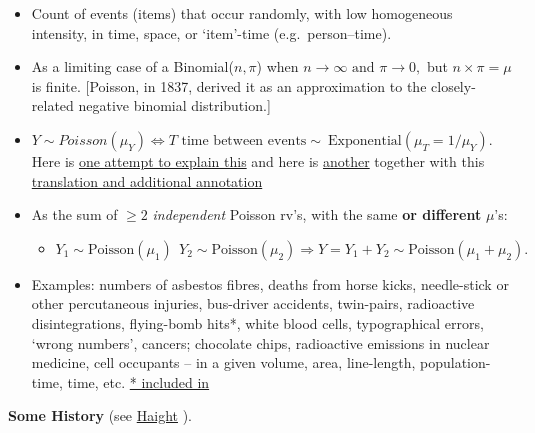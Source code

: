 \documentclass[]{book}
\providecommand{\tightlist}{%
  \setlength{\itemsep}{0pt}\setlength{\parskip}{0pt}}
\begin{document}
\begin{itemize}
\item
  Count of events (items) that occur randomly, with low
  homogeneous intensity, in time, space, or `item'-time (e.g.~person--time).
\item
  As a limiting case of a Binomial(\(n,\pi\)) when \(n \rightarrow \infty\textrm{ and } \pi \rightarrow 0,\) but \(n \times \pi = \mu\) is finite. {[}Poisson, in 1837, derived it as an approximation to the closely-related negative binomial distribution.{]}
\item
  \(Y\sim Poisson(\mu_{Y}) \Leftrightarrow T \textrm{ time between events}\sim \: \textrm{Exponential}(\mu_{T} = 1/\mu_{Y}).\)
  Here is \href{http://www.epi.mcgill.ca/hanley/bios601/Intensity-Rate/Randomness_poisson.pdf}{one attempt to explain this} and here is \href{http://www.medicine.mcgill.ca/epidemiology/hanley/Reprints/Accromath-2015-1-4.pdf}{another} together with this \href{http://www.medicine.mcgill.ca/epidemiology/hanley/bios601/Mean-Quantile/forAccromathBackTranslate.pdf}{translation and additional annotation}
\item
  As the sum of \(\ge 2\) \emph{independent} Poisson rv's, with the same \textbf{or different} \(\mu\)'s:

  \begin{itemize}
  \tightlist
  \item
    \(Y_{1} \sim \textrm{Poisson}(\mu_{1}) \: \: Y_{2} \sim \textrm{Poisson}(\mu_{2}) \Rightarrow Y = Y_{1} + Y_{2} \sim \textrm{Poisson}(\mu_{1}+\mu_{2}).\)
  \end{itemize}
\item
  Examples: numbers of asbestos fibres, deaths from horse kicks, needle-stick or other percutaneous injuries, bus-driver accidents, twin-pairs, radioactive disintegrations, flying-bomb hits*, white blood cells, typographical errors,
  `wrong numbers', cancers; chocolate chips, radioactive emissions in nuclear medicine, cell occupants -- in a given volume, area, line-length, population-time, time, etc.
  \href{http://www.epi.mcgill.ca/hanley/bios601/Intensity-Rate/}{* included in}
\end{itemize}

\textbf{Some History} (see \href{http://www.epi.mcgill.ca/hanley/statbook/HaightHistorical.pdf}{Haight} ).
\end{document}
